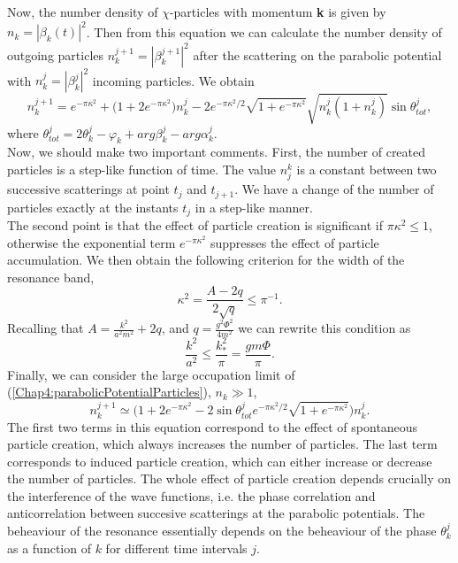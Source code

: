 \documentclass[11pt,a4paper,twoside]{book}
\begin{document}
Now, the number density of $\chi$-particles with momentum \textbf{k} is given by $ n_{k} = |\beta_{k}(t)|^{2} $. Then from this equation we can calculate the number density of outgoing particles $ n_{k}^{j+1}=|\beta_{k}^{j+1}|^{2} $ after the scattering on the parabolic potential with $ n_{k}^{j}=|\beta_{k}^{j}|^{2} $ incoming particles. We obtain
\begin{equation}
\label{Chap4:parabolicPotentialParticles}
n_{k}^{j+1}=e^{-\pi \kappa^{2}} + \Bigg(1+2e^{-\pi \kappa^{2}}\Bigg)n^{j}_{k} - 2e^{-\pi \kappa^{2}/2}\sqrt{1+e^{-\pi \kappa^{2}}}\sqrt{n_{k}^{j}(1+n_{k}^{j})}\sin \theta^{j}_{tot},
\end{equation}
where $ \theta^{j}_{tot}=2\theta^{j}_{k} - \varphi_{k} + arg \beta_{k}^{j} - arg \alpha_{k}^{j} $. \\
Now, we should make two important comments. First, the number of created particles is a step-like function of time. The value $ n_{j}^{k} $ is a constant between two successive scatterings at point $ t_{j} $ and $ t_{j+1} $. We have a change of the number of particles exactly at the instants $ t_{j} $ in a step-like manner.\\
The second point is that the effect of particle creation is significant if $ \pi \kappa^{2} \le 1 $, otherwise the exponential term $ e^{-\pi\kappa^{2}} $ suppresses the effect of particle accumulation. We then obtain the following criterion for the width of the resonance band,
\begin{equation}
\label{Chap4:constraintResonanceBand}
\kappa^{2} = \frac{A-2q}{2\sqrt{q}} \le \pi^{-1}.
\end{equation}
Recalling that $ A=\frac{k^{2}}{a^{2}m^{2}} + 2q $, and $ q=\frac{g^{2}\Phi^{2}}{4m^{2}} $ we can rewrite this condition as
\begin{equation}
\label{Chap4:resonanceBand}
\frac{k^{2}}{a^{2}} \le \frac{k_{*}^{2}}{\pi} = \frac{gm\Phi}{\pi}.
\end{equation}
Finally, we can consider the large occupation limit of (\ref{Chap4:parabolicPotentialParticles}), $ n_{k} \gg 1 $,
\begin{equation}
	\label{Chap4:nkLargeOccupation}
	n_{k}^{j+1} \simeq \Bigg(1 + 2 e^{-\pi\kappa^{2}} -2\sin\theta^{j}_{tot}e^{-\pi\kappa^{2}/2}\sqrt{1+e^{-\pi\kappa^{2}}}\Bigg)n_{k}^{j}.
\end{equation}
The first two terms in this equation correspond to the effect of spontaneous particle creation, which always increases the number of particles. The last term corresponds to induced particle creation, which can either increase or decrease the number of particles. The whole effect of particle creation depends crucially on the interference of the wave functions, i.e. the phase correlation and anticorrelation between succesive scatterings at the parabolic potentials. The beheaviour of the resonance essentially depends on the beheaviour of the phase $ \theta_{k}^{j} $ as a function of $ k $ for different time intervals $ j $.\\
\end{document}
